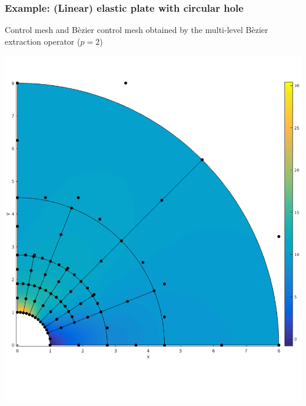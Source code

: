 \documentclass{beamer}
\begin{document}
\begin{frame}
	\frametitle{Example: (Linear) elastic plate with circular hole }%
	Control mesh and B\`ezier control mesh obtained by the multi-level B\`ezier extraction operator ($ p=2 $)\\
	\centering
	\begin{minipage}{0.49\textwidth}
		\centering
		\includegraphics[scale=0.24]{pics/plateWithAHole/plate_beziernet_3.png}
	\end{minipage}
	\begin{minipage}{0.49\textwidth}
		\centering

\end{minipage}
\end{frame}
\end{document}
